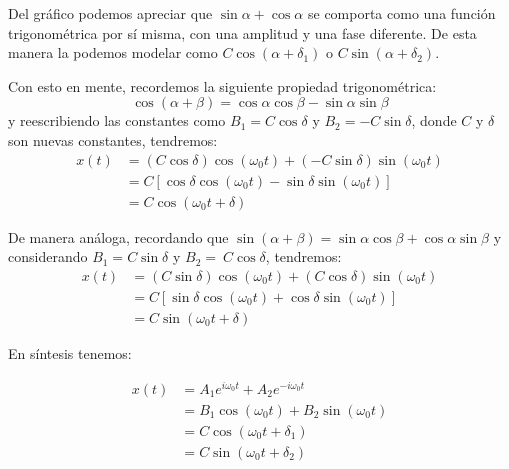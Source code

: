 \documentclass[letterpaper,11pt]{article}
\begin{document}
\begin{figure}[H]
    \centering
    
\end{figure}

\noindent Del gráfico podemos apreciar que $\sin{\alpha}+\cos{\alpha}$ se comporta como una función trigonométrica por sí misma, con una amplitud y una fase diferente. De esta manera la podemos modelar como $C\cos{(\alpha+\delta_1)}$ o $C\sin{(\alpha+\delta_2)}$.


\noindent Con esto en mente, recordemos la siguiente propiedad trigonométrica: $$\cos{(\alpha+\beta)} = \cos\alpha\cos\beta-\sin\alpha\sin\beta$$ y reescribiendo las constantes como $B_1=C\cos\delta$ y $B_2=-C\sin\delta$, donde $C$ y $\delta$ son nuevas constantes, tendremos:
\begin{align*}
    x(t) &= (C\cos\delta)\cos{(\omega_0 t)} + (-C\sin\delta)\sin{(\omega_0t)}\\
    &= C\left[\cos\delta\cos{(\omega_0 t)} - \sin\delta\sin{(\omega_0t)}\right]\\
    &= C\cos{(\omega_0t + \delta)}
\end{align*}

\noindent De manera análoga, recordando que $\sin{(\alpha+\beta)}=\sin\alpha\cos\beta+\cos\alpha\sin\beta$ y considerando $B_1=C\sin\delta$ y $B_2=~C\cos\delta$, tendremos:
\begin{align*}
    x(t) &= (C\sin\delta)\cos{(\omega_0 t)} + (C\cos\delta)\sin{(\omega_0t)}\\
    &= C\left[\sin\delta\cos{(\omega_0 t)} + \cos\delta\sin{(\omega_0t)}\right]\\
    &= C\sin{(\omega_0t + \delta)}
\end{align*}

\noindent En síntesis tenemos:

\begin{center}
    \begin{tcolorbox}[colback=white,colframe=red, width=0.4\textwidth]
        \begin{align*}
            x(t) &= A_1e^{i\omega_0t}+A_2e^{-i\omega_0t}\\
            &= B_1\cos{(\omega_0t)}+B_2\sin{(\omega_0t)}\\
            &= C\cos{(\omega_0t+\delta_1)}\\
            &= C\sin{(\omega_0t+\delta_2)}
        \end{align*}
    \end{tcolorbox}
\end{center}
\end{document}
